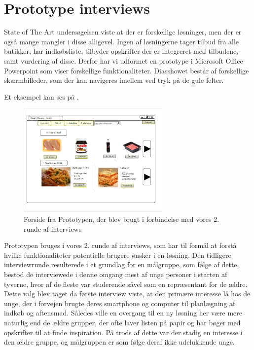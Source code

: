 \section{Prototype interviews}\label{section:interview2}
State of The Art undersøgelsen viste at der er forskellige løsninger, men der er også mange mangler i disse alligevel.
Ingen af løsningerne tager tilbud fra alle butikker, har indkøbsliste, tilbyder opskrifter der er integreret med tilbudene, samt vurdering af disse.
Derfor har vi udformet en prototype i Microsoft Office Powerpoint som viser forskellige funktionaliteter.
Diasshowet består af forskellige skærmbilleder, som der kan navigeres imellem ved tryk på de gule felter.

Et eksempel kan ses på .

\begin{figure}
\vspace{-20pt}
	\begin{center}
		\includegraphics[width=0.66\textwidth]{images/Images/prototype-forside.PNG}
	\end{center}
	\vspace{-20pt}
	\caption{Forside fra Prototypen, der blev brugt i forbindelse med vores 2. runde af interviews}\label{ss:Prototype}
	\vspace{-20pt}
\end{figure}

Prototypen bruges i vores 2. runde af interviews, som har til formål at forstå hvilke funktionaliteter potentielle brugere ønsker i en løsning.
Den tidligere interviewrunde resulterede i et grundlag for en målgruppe, som følge af dette, bestod de interviewede i denne omgang mest af unge personer i starten af tyverne, hvor af de fleste var studerende såvel som en repræsentant for de ældre.
Dette valg blev taget da første interview viste, at den primære interesse lå hos de unge, der i forvejen brugte deres smartphone og computer til planlægning af indkøb og aftensmad.
Således ville en overgang til en ny løsning her være mere naturlig end de ældre grupper, der ofte laver listen på papir og har bøger med opskrifter til at finde inspiration.
På trods af dette var der stadig en interesse i den ældre gruppe, og målgruppen er som følge deraf ikke udelukkende unge.

